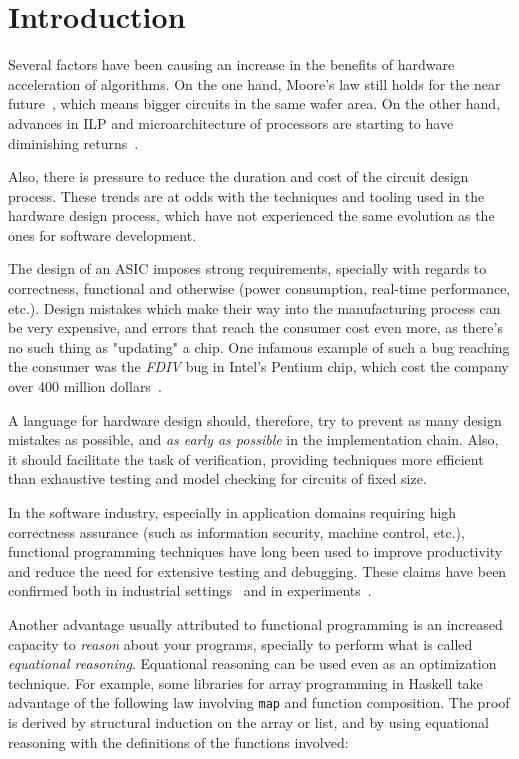 \chapter{Introduction}
\label{chap:intro}
    Several factors have been causing an increase in the benefits of hardware acceleration of algorithms.
    On the one hand, Moore's law still holds for the near future~\cite{itrs},
    which means bigger circuits in the same wafer area.
    On the other hand, advances in \ac{ILP} and microarchitecture of processors
    are starting to have diminishing returns~\cite{dark-silicon}.

    Also, there is pressure to reduce the duration and cost of the circuit design process.
    These trends are at odds with the techniques and tooling used in the hardware design process,
    which have not experienced the same evolution as the ones for software development.

    The design of an \ac{ASIC} imposes strong requirements,
    specially with regards to correctness, functional and otherwise (power consumption, real-time performance, etc.).
    Design mistakes which make their way into the manufacturing process can be very expensive,
    and errors that reach the consumer cost even more, as there's no such thing as "updating" a chip.
    One infamous example of such a bug reaching the consumer was the \emph{FDIV} bug in Intel's Pentium chip,
    which cost the company over 400 million dollars~\cite{intel-fdiv}.

    A language for hardware design should, therefore, try to prevent as many design mistakes as possible,
    and \emph{as early as possible} in the implementation chain.
    Also, it should facilitate the task of verification,
    providing techniques more efficient than exhaustive testing and model checking for circuits of fixed size.

    In the software industry, especially in application domains requiring high correctness assurance
    (such as information security, machine control, etc.),
    functional programming techniques have long been used to improve productivity
    and reduce the need for extensive testing and debugging.
    These claims have been confirmed both in industrial settings~\cite{haskell-productivity-wiger}
    and in experiments~\cite{haskell-productivity-hudak}.

    Another advantage usually attributed to functional programming is an increased capacity to
    \emph{reason} about your programs, specially to perform what is called \emph{equational reasoning}.
    Equational reasoning can be used even as an optimization technique.
    For example, some libraries for array programming in Haskell take advantage of the following
    law involving \texttt{map} and function composition.
    The proof is derived by structural induction on the array or list,
    and by using equational reasoning with the definitions of the functions involved:


